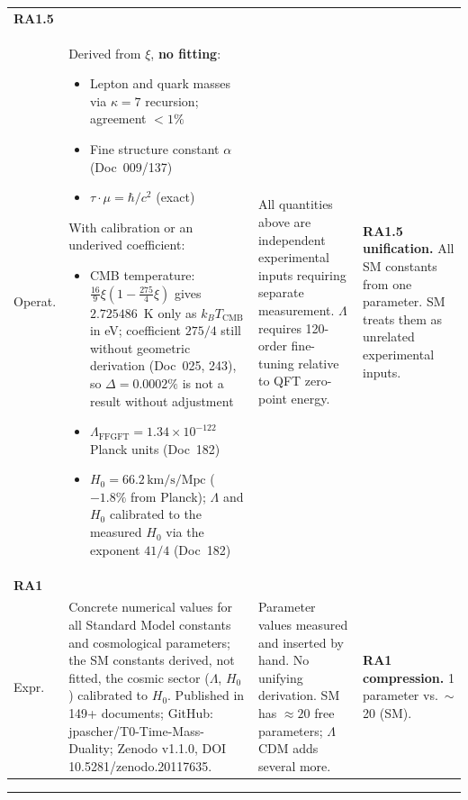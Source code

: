 {\begin{longtable}{p{2.0cm}p{4.4cm}p{4.4cm}p{2.55cm}}
\midrule

\textbf{RA1.5}\\Operat. &
Derived from $\xi$, \textbf{no fitting}:
{\small\begin{itemize}[leftmargin=*,nosep,itemsep=1pt]
  \item Lepton and quark masses via $\kappa=7$ recursion; agreement $<1\%$
  \item Fine structure constant $\alpha$ (Doc~009/137)
  \item $\tau\cdot\mu = \hbar/c^2$ (exact)
\end{itemize}}
With calibration or an underived coefficient:
{\small\begin{itemize}[leftmargin=*,nosep,itemsep=1pt]
  \item CMB temperature: $\tfrac{16}{9}\xi(1-\tfrac{275}{4}\xi)$ gives $2.725486$~K only as $k_BT_\text{CMB}$ in eV; coefficient $275/4$ still without geometric derivation (Doc~025, 243), so $\Delta = 0.0002\%$ is not a result without adjustment
  \item $\Lambda_\text{FFGFT} = 1.34\times10^{-122}$ Planck units (Doc~182)
  \item $H_0 = 66.2\,\text{km/s/Mpc}$ ($-1.8\%$ from Planck); $\Lambda$ and $H_0$ calibrated to the measured $H_0$ via the exponent $41/4$ (Doc~182)
\end{itemize}} &
All quantities above are independent experimental inputs requiring separate measurement. $\Lambda$ requires 120-order fine-tuning relative to QFT zero-point energy. &
\textbf{RA1.5 unification.} All SM constants from one parameter. SM treats them as unrelated experimental inputs. \\

\midrule

\textbf{RA1}\\Expr. &
Concrete numerical values for all Standard Model constants and cosmological parameters; the SM constants derived, not fitted, the cosmic sector ($\Lambda$, $H_0$) calibrated to $H_0$. Published in 149+ documents; GitHub: jpascher/T0-Time-Mass-Duality; Zenodo v1.1.0, DOI 10.5281/zenodo.20117635. &
Parameter values measured and inserted by hand. No unifying derivation. SM has $\approx\!20$ free parameters; $\Lambda$CDM adds several more. &
\textbf{RA1 compression.} 1 parameter vs.\ $\sim$20 (SM). \\

\end{longtable}
}

\vspace{0.3em}\hrule\vspace{0.4em}

